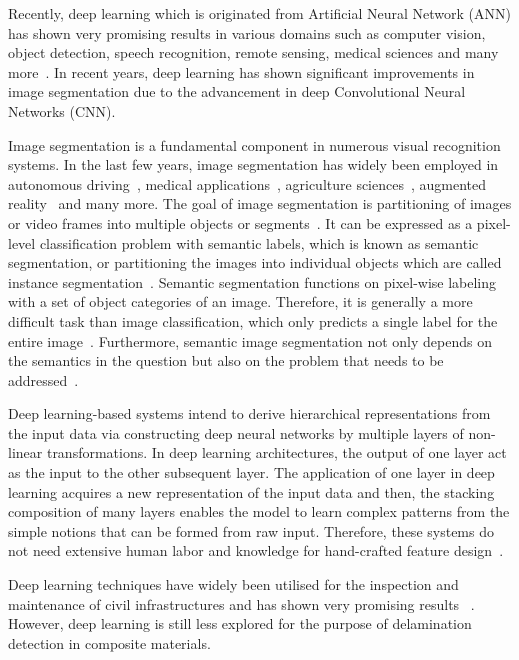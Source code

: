 Recently, deep learning which is originated from Artificial Neural Network (ANN) has shown very promising results in various domains such as computer vision, object detection, speech recognition, remote sensing, medical sciences and many more~\cite{deng2014deep, mohanty2016using, zhang2020well, pashaei2020review}. 
In recent years, deep learning has shown significant improvements in image segmentation due to the advancement in deep Convolutional Neural Networks (CNN). 

Image segmentation is a fundamental component in numerous visual recognition systems. 
In the last few years, image segmentation has widely been employed in autonomous driving~\cite{zhang2013understanding, cordts2016cityscapes, ros2016synthia, li2018real}, medical applications~\cite{taghanaki2020deep}, agriculture sciences~\cite{milioto2018real}, augmented reality~\cite{miksik2015semantic} and many more. 
The goal of image segmentation is partitioning of images or video frames into multiple objects or segments~\cite{szeliski2010computer}. 
It can be expressed as a pixel-level classification problem with semantic labels, which is known as semantic segmentation, or partitioning the images into individual objects which are called instance segmentation~\cite{minaee2020image}. 
Semantic segmentation functions on pixel-wise labeling with a set of object categories of an image. 
Therefore, it is generally a more difficult task than image classification, which only predicts a single label for the entire image~\cite{minaee2020image}. 
Furthermore, semantic image segmentation not only depends on the semantics in the question but also on the problem that needs to be addressed~\cite{ghosh2019understanding}.

Deep learning-based systems intend to derive hierarchical representations from the input data via constructing deep neural networks by multiple layers of non-linear transformations. 
In deep learning architectures, the output of one layer act as the input to the other subsequent layer. 
The application of one layer in deep learning acquires a new representation of the input data and then, the stacking composition of many layers enables the model to learn complex patterns from the simple notions that can be formed from raw input. 
Therefore, these systems do not need extensive human labor and knowledge for hand-crafted feature design~\cite{zhao2019deep, yuan2020machine}.

Deep learning techniques have widely been utilised for the inspection and maintenance of civil infrastructures and has shown very promising results ~\cite{cha2017deep, lin2017structural, liu2019computer}. 
However, deep learning is still less explored for the purpose of delamination detection in composite materials.   

